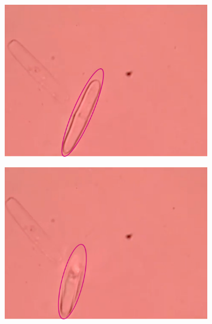\documentclass[10pt,aspectratio=1610,compress,dvipsnames]{beamer}
\begin{document}
\begin{frame}
{\begin{figure}
     \centering
     \begin{subfigure}[b]{0.3\textwidth}
         \centering
         \includegraphics[width=\textwidth]{Results/Fifth/pennate1water.png}
         \caption{}
         \label{fig:y equals x}
     \end{subfigure}
     \hfill
     \begin{subfigure}[b]{0.3\textwidth}
         \centering
         \includegraphics[width=\textwidth]{Results/Fifth/pennatewater2.png}
         \caption{}
         \label{fig:three sin x}
     \end{subfigure}
     \hfill
     \begin{subfigure}[b]{0.3\textwidth}

\end{subfigure}
\end{figure}}
\end{frame}
\end{document}
